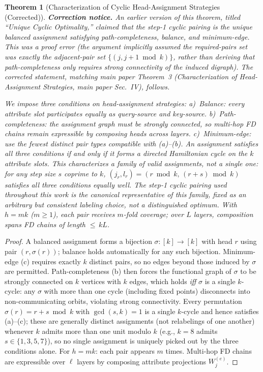 \documentclass[conference]{IEEEtran}
\newtheorem{theorem}{Theorem}
\begin{document}
\begin{theorem}[Characterization of Cyclic Head-Assignment Strategies (Corrected)]
\label{thm:app1}
\textup{\textbf{Correction notice.}} An earlier version of this theorem, titled ``Unique Cyclic Optimality,'' claimed that the step-1 cyclic pairing is the \emph{unique} balanced assignment satisfying path-completeness, balance, and minimum-edge. This was a proof error (the argument implicitly assumed the required-pairs set was exactly the adjacent-pair set $\{(j,j{+}1\bmod k)\}$, rather than deriving that path-completeness only requires strong connectivity of the induced digraph). The corrected statement, matching main paper Theorem~3 (Characterization of Head-Assignment Strategies, main paper Sec.~IV), follows.

We impose three conditions on head-assignment strategies: \textup{a)}~\emph{Balance}: every attribute slot participates equally as query-source and key-source. \textup{b)}~\emph{Path-completeness}: the assignment graph must be strongly connected, so multi-hop FD chains remain expressible by composing heads across layers. \textup{c)}~\emph{Minimum-edge}: use the fewest distinct pair types compatible with (a)--(b). An assignment satisfies all three conditions \emph{if and only if} it forms a directed Hamiltonian cycle on the $k$ attribute slots. This characterizes a \emph{family} of valid assignments, not a single one: for any step size $s$ coprime to $k$, $(j_r,l_r) = (r\bmod k,\,(r{+}s)\bmod k)$ satisfies all three conditions equally well. The step-1 cyclic pairing used throughout this work is the canonical representative of this family, fixed as an arbitrary but consistent labeling choice, not a distinguished optimum. With $h{=}mk$ ($m\geq1$), each pair receives $m$-fold coverage; over $L$ layers, composition spans FD chains of length ${\leq}\,kL$.
\end{theorem}
\begin{proof}
	\renewcommand{\qedsymbol}{}
A balanced assignment forms a bijection $\sigma:[k]\to[k]$ with head $r$ using pair $(r,\sigma(r))$; balance holds automatically for any such bijection. Minimum-edge (c) requires exactly $k$ distinct pairs, so no edges beyond those induced by $\sigma$ are permitted. Path-completeness (b) then forces the functional graph of $\sigma$ to be strongly connected on $k$ vertices with $k$ edges, which holds \emph{iff} $\sigma$ is a single $k$-cycle: any $\sigma$ with more than one cycle (including fixed points) disconnects into non-communicating orbits, violating strong connectivity. Every permutation $\sigma(r) = r+s\bmod k$ with $\gcd(s,k)=1$ is a single $k$-cycle and hence satisfies (a)--(c); these are generally distinct assignments (not relabelings of one another) whenever $k$ admits more than one unit modulo $k$ (e.g., $k=8$ admits $s\in\{1,3,5,7\}$), so no single assignment is uniquely picked out by the three conditions alone. For $h{=}mk$: each pair appears $m$ times. Multi-hop FD chains are expressible over $\ell$ layers by composing attribute projections $W_j^{(e)}$.
\end{proof}
\end{document}
